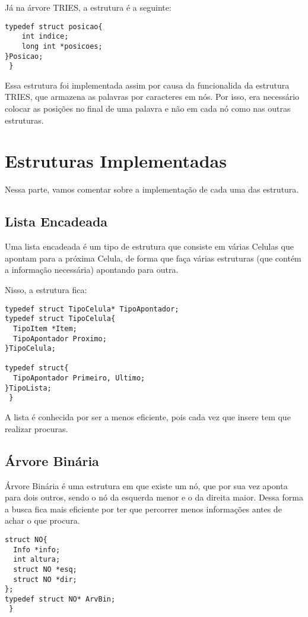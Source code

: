 \documentclass[
	12pt,				%
    oneside,			%
	a4paper,			%
	english,			%
	french,				%
	spanish,			%
	brazil,				%
	]{abntex2}
\begin{document}
 Já na árvore TRIES, a estrutura é a seguinte:

 \begin{lstlisting}
typedef struct posicao{
    int indice;
    long int *posicoes;
}Posicao;
 } \end{lstlisting}

 Essa estrutura foi implementada assim por causa da funcionalida da estrutura TRIES, que armazena as palavras por caracteres em nós. Por isso, era necessário colocar as posições no final de uma palavra e não em cada nó como nas outras estruturas.


\chapter{Estruturas Implementadas}

Nessa parte, vamos comentar sobre a implementação de cada uma das estrutura.

\section{Lista Encadeada}

Uma lista encadeada é um tipo de estrutura que consiste em várias Celulas que apontam para a próxima Celula, de forma que faça várias estruturas (que contém a informação necessária) apontando para outra.

Nisso, a estrutura fica:

 \begin{lstlisting}
typedef struct TipoCelula* TipoApontador;
typedef struct TipoCelula{
  TipoItem *Item;
  TipoApontador Proximo;
}TipoCelula;

typedef struct{
  TipoApontador Primeiro, Ultimo;
}TipoLista;
 } \end{lstlisting}

A lista é conhecida por ser a menos eficiente, pois cada vez que insere tem que realizar procuras.

\section{Árvore Binária}
Árvore Binária é uma estrutura em que existe um nó, que por sua vez aponta para dois outros, sendo o nó da esquerda menor e o da direita maior. Dessa forma a busca fica mais eficiente por ter que percorrer menos informações antes de achar o que procura.

 \begin{lstlisting}
struct NO{
  Info *info;
  int altura;
  struct NO *esq;
  struct NO *dir;
};
typedef struct NO* ArvBin;
 } \end{lstlisting}
\end{document}
